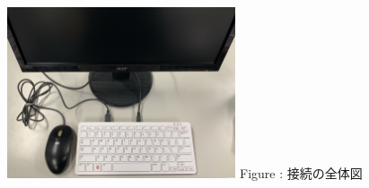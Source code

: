 \documentclass[a4paper,12pt]{jarticle}
\begin{document}
\begin{figure}[ht]
  \centering
  \begin{minipage}{12.204cm}
    {\upshape
      \includegraphics[width=0.6\textwidth]{connections01-2023.jpg}
      \newline
      Figure : 接続の全体図}

  \end{minipage}
\end{figure}
\end{document}
